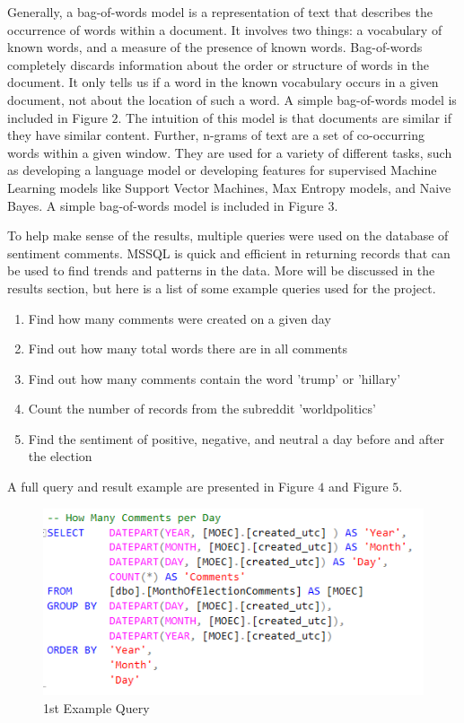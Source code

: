 \documentclass[letterpaper]{article}
\begin{document}
Generally, a bag-of-words model is a representation of text that describes the occurrence of words within a document. It involves two things: a vocabulary of known words, and a measure of the presence of known words. Bag-of-words completely discards information about the order or structure of words in the document. It only tells us if a word in the known vocabulary occurs in a given document, not about the location of such a word. A simple bag-of-words model is included in Figure $2$. The intuition of this model is that documents are similar if they have similar content. Further, n-grams of text are a set of co-occurring words within a given window. They are used for a variety of different tasks, such as developing a language model or developing features for supervised Machine Learning models like Support Vector Machines, Max Entropy models, and Naive Bayes. A simple bag-of-words model is included in Figure $3$.

To help make sense of the results, multiple queries were used on the database of sentiment comments. MSSQL is quick and efficient in returning records that can be used to find trends and patterns in the data. More will be discussed in the results section, but here is a list of some example queries used for the project.

\begin{enumerate}
    \item Find how many comments were created on a given day
    \item Find out how many total words there are in all comments
    \item Find out how many comments contain the word 'trump' or 'hillary'
    \item Count the number of records from the subreddit 'worldpolitics'
    \item Find the sentiment of positive, negative, and neutral a day before and after the election
\end{enumerate}

A full query and result example are presented in Figure $4$ and Figure $5$.

\begin{figure}[!htb]
\begin{center}
\includegraphics[scale=0.7]{Images/example_query.PNG}
\caption{1st Example Query}
\label{fig1}
\end{center}
\end{figure}
\end{document}

